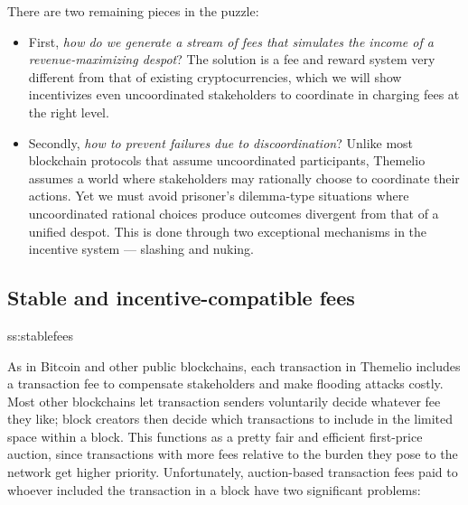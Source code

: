 \documentclass[letterpaper,12pt,oneside]{article}
\begin{document}
There are two remaining pieces in the puzzle:
\begin{itemize}
    \item First, \emph{how do we generate a stream of fees that simulates the income of a revenue-maximizing despot}? The solution is a fee and reward system very different from that of existing cryptocurrencies, which we will show incentivizes even uncoordinated stakeholders to coordinate in charging fees at the right level.
    \item Secondly, \emph{how to prevent failures due to discoordination}? Unlike most blockchain protocols that assume uncoordinated participants, Themelio assumes a world where stakeholders may rationally choose to coordinate their actions. Yet we must avoid prisoner's dilemma-type situations where uncoordinated rational choices produce outcomes divergent from that of a unified despot. This is done through two exceptional mechanisms in the incentive system --- slashing and nuking.
\end{itemize}


\subsection{Stable and incentive-compatible fees} {ss:stablefees}

As in Bitcoin and other public blockchains, each transaction in Themelio includes a transaction fee to compensate stakeholders and make flooding attacks costly. Most other blockchains let transaction senders voluntarily decide whatever fee they like; block creators then decide which transactions to include in the limited space within a block. This functions as a pretty fair and efficient first-price auction, since transactions with more fees relative to the burden they pose to the network get higher priority. Unfortunately, auction-based transaction fees paid to whoever included the transaction in a block have two significant problems:
\end{document}
